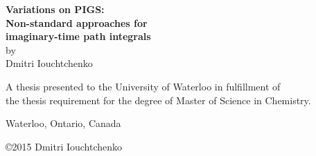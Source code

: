\documentclass[10pt, twoside, final]{book}
\begin{document}
\frontmatter

\pagestyle{plain}

\begin{titlepage}
\begin{center}

\mbox{}\vfill
\vfill
\vfill

{ \LARGE \bfseries
	Variations on PIGS: \\[1 mm]
	Non-standard approaches for \\[1 mm]
	imaginary-time path integrals
} \\[5 mm]

by \\[5 mm]

{ \Large Dmitri Iouchtchenko }

\vfill
\vfill
\vfill

A thesis presented to the University of Waterloo in fulfillment of \\
the thesis requirement for the degree of Master of Science in Chemistry.

\vfill

Waterloo, Ontario, Canada

\vfill

\copyright 2015 Dmitri Iouchtchenko

\vfill

\end{center}
\end{titlepage}



\tableofcontents

\renewcommand{\nomname}{List of abbreviations}
\def\nomlabel#1{\hspace{5 mm}\textbf{#1}\hfil}
\printnomenclature[1 in]

\renewcommand{\listfigurename}{List of figures}
\listoffigures

\renewcommand{\listtablename}{List of tables}
\listoftables

\mainmatter

\pagestyle{fancy}

\appendix

\backmatter

\printbibliography[title={References}, heading=bibnumbered, sorting=customsort]
\end{document}
